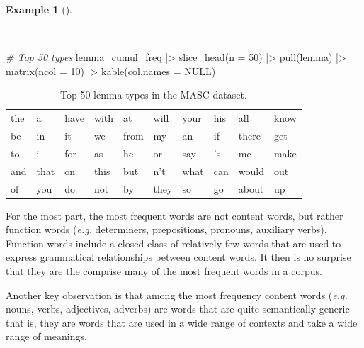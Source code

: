 \documentclass[
  letterpaper,
  DIV=11,
  numbers=noendperiod]{scrreprt}
\newenvironment{Shaded}{\begin{snugshade}}{\end{snugshade}}
\newcommand{\AttributeTok}[1]{\textcolor[rgb]{0.00,0.00,0.00}{#1}}
\newcommand{\CommentTok}[1]{\textcolor[rgb]{0.00,0.00,0.00}{\textit{#1}}}
\newcommand{\ConstantTok}[1]{\textcolor[rgb]{0.00,0.00,0.00}{#1}}
\newcommand{\DecValTok}[1]{\textcolor[rgb]{0.00,0.00,0.00}{#1}}
\newcommand{\FunctionTok}[1]{\textcolor[rgb]{0.00,0.00,0.00}{#1}}
\newcommand{\NormalTok}[1]{\textcolor[rgb]{0.00,0.00,0.00}{#1}}
\newcommand{\SpecialCharTok}[1]{\textcolor[rgb]{0.00,0.00,0.00}{#1}}
\theoremstyle{definition}
\newtheorem{example}{Example}[chapter]
\theoremstyle{remark}
\begin{document}
\begin{example}[]\protect\hypertarget{exm-eda-masc-count-top-50}{}\label{exm-eda-masc-count-top-50}

~

\begin{Shaded}
\begin{Highlighting}[]
\CommentTok{\# Top 50 types}
\NormalTok{lemma\_cumul\_freq }\SpecialCharTok{|\textgreater{}}
  \FunctionTok{slice\_head}\NormalTok{(}\AttributeTok{n =} \DecValTok{50}\NormalTok{) }\SpecialCharTok{|\textgreater{}}
  \FunctionTok{pull}\NormalTok{(lemma) }\SpecialCharTok{|\textgreater{}}
  \FunctionTok{matrix}\NormalTok{(}\AttributeTok{ncol =} \DecValTok{10}\NormalTok{) }\SpecialCharTok{|\textgreater{}}
  \FunctionTok{kable}\NormalTok{(}\AttributeTok{col.names =} \ConstantTok{NULL}\NormalTok{)}
\end{Highlighting}
\end{Shaded}

\begin{longtable}[]{@{}llllllllll@{}}

\caption{\label{tbl-eda-masc-count-top-50}Top 50 lemma types in the MASC
dataset.}

\tabularnewline

\toprule\noalign{}
\endhead
\bottomrule\noalign{}
\endlastfoot
the & a & have & with & at & will & your & his & all & know \\
be & in & it & we & from & my & an & if & there & get \\
to & i & for & as & he & or & say & 's & me & make \\
and & that & on & this & but & n't & what & can & would & out \\
of & you & do & not & by & they & so & go & about & up \\

\end{longtable}

\end{example}

For the most part, the most frequent words are not content words, but
rather function words (\emph{e.g.} determiners, prepositions, pronouns,
auxiliary verbs). Function words include a closed class of relatively
few words that are used to express grammatical relationships between
content words. It then is no surprise that they are the comprise many of
the most frequent words in a corpus.

Another key observation is that among the most frequency content words
(\emph{e.g.} nouns, verbs, adjectives, adverbs) are words that are quite
semantically generic --that is, they are words that are used in a wide
range of contexts and take a wide range of meanings.
\end{document}
